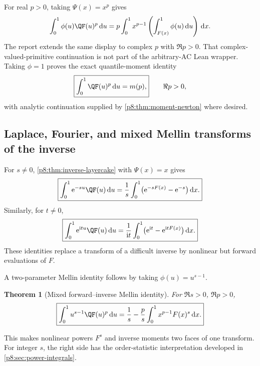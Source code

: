 \documentclass[11pt,oneside]{article}
\newtheorem{theorem}{Theorem}[section]
\theoremstyle{definition}
\theoremstyle{remark}
\newcommand{\dd}{\,\mathrm d}
\newcommand{\e}{\mathrm e}
\newcommand{\ii}{\mathrm i}
\newcommand{\1}{\mathbf 1}
\begin{document}
For real \(p>0\), taking \(\Psi(x)=x^p\) gives
\begin{equation}
 \int_0^1\phi(u)\QF(u)^p\dd u
 =p\int_0^1x^{p-1}\left(\int_{F(x)}^1\phi(u)\dd u\right)\dd x.
 \label{p8:eq:inverse-power-layercake}
\end{equation}
The report extends the same display to complex \(p\) with \(\Re p>0\).  That
complex-valued-primitive continuation is not part of the arbitrary-AC Lean wrapper.
Taking \(\phi=1\) proves the exact quantile-moment identity
\begin{equation}
 \boxed{\int_0^1\QF(u)^p\dd u=m(p),}
 \qquad \Re p>0,
 \label{p8:eq:quantile-moments}
\end{equation}
with analytic continuation supplied by \cref{p8:thm:moment-newton} where desired.

\subsection{Laplace, Fourier, and mixed Mellin transforms of the inverse}

For \(s\ne0\), \cref{p8:thm:inverse-layercake} with \(\Psi(x)=x\) gives
\begin{equation}
 \boxed{
 \int_0^1\e^{-su}\QF(u)\dd u
 =\frac1s\int_0^1\bigl(\e^{-sF(x)}-\e^{-s}\bigr)\dd x.}
 \label{p8:eq:Q-Laplace}
\end{equation}
Similarly, for \(t\ne0\),
\begin{equation}
 \boxed{
 \int_0^1\e^{\ii tu}\QF(u)\dd u
 =\frac1{\ii t}\int_0^1\bigl(\e^{\ii t}-\e^{\ii tF(x)}\bigr)\dd x.}
 \label{p8:eq:Q-Fourier}
\end{equation}
These identities replace a transform of a difficult inverse by nonlinear but
forward evaluations of \(F\).

A two-parameter Mellin identity follows by taking \(\phi(u)=u^{s-1}\).

\begin{theorem}[Mixed forward--inverse Mellin identity]
\label{p8:thm:mixed-Mellin-Q}
For \(\Re s>0\), \(\Re p>0\),
\begin{equation}
 \boxed{
 \int_0^1u^{s-1}\QF(u)^p\dd u
 =\frac1s-\frac p s\int_0^1x^{p-1}F(x)^s\dd x.}
 \label{p8:eq:mixed-Mellin-Q}
\end{equation}
\statusprovedPartll
\end{theorem}

This makes nonlinear powers \(F^s\) and inverse moments two faces of one
transform.  For integer \(s\), the right side has the order-statistic
interpretation developed in \cref{p8:sec:power-integrals}.
\end{document}
